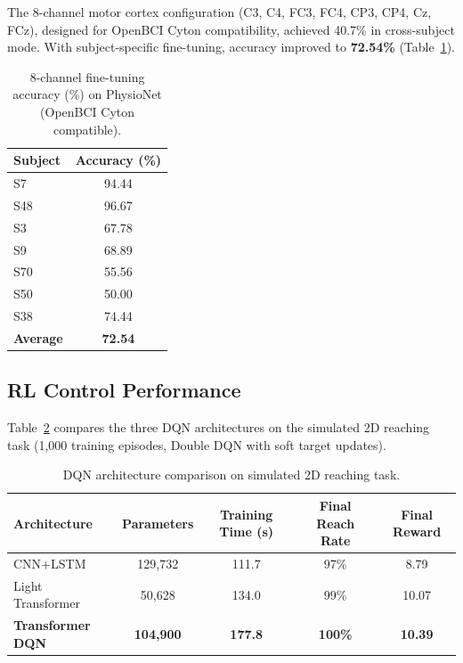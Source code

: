 \documentclass[12pt, a4paper]{article}
\begin{document}
The 8-channel motor cortex configuration (C3, C4, FC3, FC4, CP3, CP4, Cz, FCz), designed for OpenBCI Cyton compatibility, achieved 40.7\% in cross-subject mode. With subject-specific fine-tuning, accuracy improved to \textbf{72.54\%} (Table~\ref{tab:8ch_finetune}).

\begin{table}[htbp]
\centering
\caption{8-channel fine-tuning accuracy (\%) on PhysioNet (OpenBCI Cyton compatible).}
\label{tab:8ch_finetune}
\begin{tabular}{lc}
\toprule
\textbf{Subject} & \textbf{Accuracy (\%)} \\
\midrule
S7  & 94.44 \\
S48 & 96.67 \\
S3  & 67.78 \\
S9  & 68.89 \\
S70 & 55.56 \\
S50 & 50.00 \\
S38 & 74.44 \\
\midrule
\textbf{Average} & \textbf{72.54} \\
\bottomrule
\end{tabular}
\end{table}

\subsection{RL Control Performance}

Table~\ref{tab:dqn_comparison} compares the three DQN architectures on the simulated 2D reaching task (1,000 training episodes, Double DQN with soft target updates).

\begin{table}[htbp]
\centering
\caption{DQN architecture comparison on simulated 2D reaching task.}
\label{tab:dqn_comparison}
\begin{tabular}{lcccc}
\toprule
\textbf{Architecture} & \textbf{Parameters} & \textbf{Training Time (s)} & \textbf{Final Reach Rate} & \textbf{Final Reward} \\
\midrule
CNN+LSTM        & 129,732  & 111.7  & 97\%  & 8.79 \\
Light Transformer & 50,628 & 134.0  & 99\%  & 10.07 \\
\textbf{Transformer DQN} & \textbf{104,900} & \textbf{177.8} & \textbf{100\%} & \textbf{10.39} \\
\bottomrule
\end{tabular}
\end{table}
\end{document}
